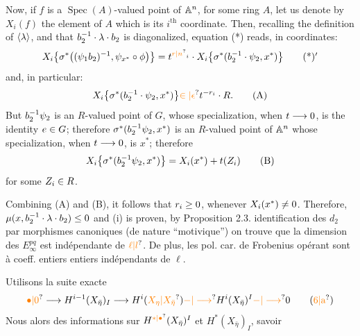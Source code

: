 Now, if $f$ is a $\operatorname{Spec}(A)$-valued point of $\mathbb{A}^n$, for some ring $A$, let us denote by $X_i(f)$ the element of $A$ which is its $i^{\mathrm{th}}$ coordinate. Then, recalling the definition of $\langle\lambda\rangle$, and that $b_2^{-1}\cdot\lambda\cdot b_2$ is diagonalized, equation (*) reads, in coordinates:
\[
X_i\handwritten{\bigl\{}\handwritten{\sigma}^*\handwritten{\bigl(}(\handwritten{\psi}_1 b_2)^{-1},\handwritten{\psi_{x^*}\circ\phi}\handwritten{\bigr)\bigr\}}=t^{\handwritten{\unsure{r|n}_i}}\cdot X_i\handwritten{\bigl\{}\handwritten{\sigma}^*(b_2^{-1}\cdot\handwritten{\psi}_2,x^*)\handwritten{\bigr\}}
\tag*{(*)$\handwritten{'}$}
\]
and, in particular:
\[
X_i\handwritten{\bigl\{}\handwritten{\sigma}^*(b_2^{-1}\cdot\handwritten{\psi}_2,x^*)\handwritten{\bigr\}}\handwritten{\unsure{\in|\epsilon}}t^{\handwritten{-r_i}}\cdot R.
\tag*{(A)}
\]
But $b_2^{-1}\psi_2$ is an $R$-valued point of $G$, whose specialization, when $t\longrightarrow0$, is the identity $e\in G$; therefore $\sigma^*(b_2^{-1}\psi_2,x^*)$ is an $R$-valued point of $\mathbb{A}^n$ whose specialization, when $t\longrightarrow0$, is $x^*$; therefore
\[
X_i\bigl\{\sigma^*(b_2^{-1}\psi_2,x^*)\bigr\}=X_i(x^*)+t(Z_i)
\tag*{(B)}
\]
for some $Z_i\in R$.

Combining (A) and (B), it follows that $r_i\geq0$, whenever $X_i(x^*)\neq0$. Therefore, $\mu(x,b_2^{-1}\cdot\lambda\cdot b_2)\leq0$ and (i) is proven, by Proposition 2.3.
 identification des $d_2$ par morphismes canoniques (de nature ``motivique'') on trouve que la dimension des $E_\infty^{pq}$ est indépendante de $\unsure{\ell|l}$. De plus, les  pol. car. de Frobenius  opérant sont à coeff. entiers entiers indépendants de $\ell$.

Utilisons la suite exacte
\[
\unsure{\bullet|0}\longrightarrow H^{i-1}(X_{\bar\eta})_I\longrightarrow H^i(\unsure{X_\eta|X_{\bar\eta}})\unsure{-|\longrightarrow}H^i(X_{\bar\eta})^I\unsure{-|\longrightarrow}0
\tag*{(\unsure{6|a})}
\]
Nous   alors des informations sur $H^{\unsure{*|\bullet}}(X_{\bar\eta})^I$ et $H^*(X_{\bar\eta})_I$, savoir

